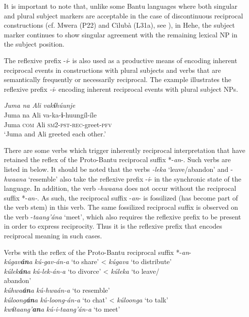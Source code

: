 \documentclass[output=paper,
            colorlinks, citecolor=brown
            ,draftmode
		  ]{langscibook}
\begin{document}
It is important to note that, unlike some Bantu languages where both singular and plural subject markers are acceptable in the case of discontinuous reciprocal constructions (cf. Mwera (P22) and Cilubà (L31a), see \cites[763--764]{BostoenEtAl2015}[183]{SchadebergBostoen2019}), in Hehe, the subject marker continues to show singular agreement with the remaining lexical NP in the subject position.

The reflexive prefix -\textit{i}{}- is also used as a productive means of encoding inherent reciprocal events in constructions with plural subjects and verbs that are semantically frequently or necessarily reciprocal. The example  illustrates the reflexive prefix \textit{\nobreakdash-i}{}- encoding inherent reciprocal events with plural subject NPs.

\ea\label{ex:ngwasi:15}
\textit{Juma na Ali vak}\textbf{\textit{i}}\textit{húunje}\\
\gll Juma   na   Ali   va-ka-\textbf{i}{}-huungíl-íle\\
Juma \textsc{com}  Ali   \textsc{sm2-pst-rec}-greet-\textsc{pfv}\\
\glt ‘Juma and Ali greeted each other.’
\z

There are some verbs which trigger inherently reciprocal interpretation that have retained the reflex of the Proto\nobreakdash-Bantu reciprocal suffix *-\textit{an}{}-. Such verbs are listed in  below. It should be noted that the verbs \textit{{}-leka} ‘leave/abandon’ and -\textit{hwaana} ‘resemble’ also take the reflexive prefix -\textit{i}{}- in the synchronic state of the language. In addition, the verb \nobreakdash-\textit{hwaana} does not occur without the reciprocal suffix *\nobreakdash-\textit{an-}. As such, the reciprocal suffix -\textit{an}{}- is fossilized (has become part of the verb stem) in this verb. The same fossilized reciprocal suffix is observed on the verb -\textit{taang’ána} ‘meet’, which also requires the reflexive prefix to be present in order to express reciprocity. Thus it is the reflexive prefix that encodes reciprocal meaning in such cases.

\ea\label{ex:ngwasi:16}
Verbs with the reflex of the Proto-Bantu reciprocal suffix *-\textit{an}{}-\\
\gllllll \textit{kúgav}\textbf{\textit{án}}\textit{a}  \textit{kú-gav-án-a}    {‘to share’}  < \textit{kúgava} {‘to distribute’}\\
\textit{kúlek}\textbf{\textit{án}}\textit{a}  \textit{kú-lek-án-a}    {‘to divorce’}   < \textit{kúleka} {‘to leave/}\\
{} {} {} {} {} {abandon’}\\
\textit{kúhwa}\textbf{\textit{án}}\textit{a}  \textit{kú-hwaán-a}    {‘to resemble’}\\
\textit{kúloong}\textbf{\textit{án}}\textit{a}  \textit{kú-loong-án-a} {‘to chat’}  < \textit{kúloonga} {‘to talk’}\\
\textit{kw}\textbf{\textit{í}}\textit{taang’}\textbf{\textit{an}}\textit{a}  \textit{kú-i-taang’án-a} {‘to meet’}\\
\z
\end{document}
